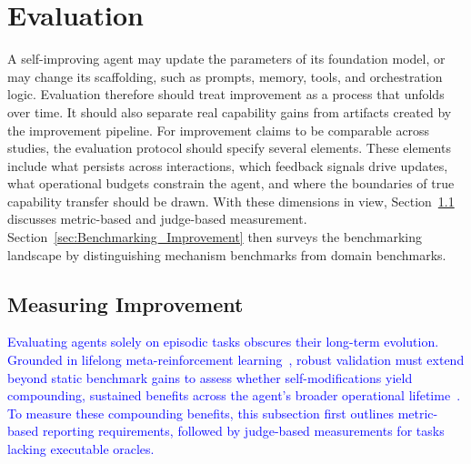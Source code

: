 \section{Evaluation}
\label{sec:Evaluation} 


A self-improving agent may update the parameters of its foundation model, or  may change its scaffolding, such as prompts, memory, tools, and orchestration logic. Evaluation  therefore should treat improvement as a process that unfolds over time. It should also separate real capability gains from artifacts created by the improvement pipeline. For improvement claims to be comparable across studies, the evaluation protocol should specify several elements. These elements include what persists across interactions, which feedback signals drive updates, what operational budgets constrain the agent, and where the boundaries of true capability transfer should be drawn. With these dimensions in view, Section~\ref{sec:Measuring_Improvement} discusses metric-based and judge-based measurement. Section~\ref{sec:Benchmarking_Improvement} then surveys the benchmarking landscape by distinguishing mechanism benchmarks from domain benchmarks.



\subsection{Measuring Improvement}
\label{sec:Measuring_Improvement}


\textcolor{blue}{Evaluating agents solely on episodic tasks obscures their long-term evolution. Grounded in lifelong meta-reinforcement learning~\citep{Schmidhuber1994OnLH}, robust validation must extend beyond static benchmark gains to assess whether self-modifications yield compounding, sustained benefits across the agent's broader operational lifetime~\citep{schmidhuber1997shifting, schmidhuber1998reinforcement, schmidhuber1999general}. To measure these compounding benefits, this subsection first outlines metric-based reporting requirements, followed by judge-based measurements for tasks lacking executable oracles.}


